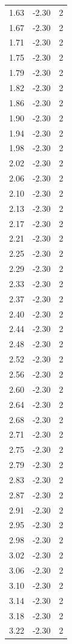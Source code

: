 \begin{longtable}{lrr}
  1.63 & -2.30 & 2 \\
  1.67 & -2.30 & 2 \\
  1.71 & -2.30 & 2 \\
  1.75 & -2.30 & 2 \\
  1.79 & -2.30 & 2 \\
  1.82 & -2.30 & 2 \\
  1.86 & -2.30 & 2 \\
  1.90 & -2.30 & 2 \\
  1.94 & -2.30 & 2 \\
  1.98 & -2.30 & 2 \\
  2.02 & -2.30 & 2 \\
  2.06 & -2.30 & 2 \\
  2.10 & -2.30 & 2 \\
  2.13 & -2.30 & 2 \\
  2.17 & -2.30 & 2 \\
  2.21 & -2.30 & 2 \\
  2.25 & -2.30 & 2 \\
  2.29 & -2.30 & 2 \\
  2.33 & -2.30 & 2 \\
  2.37 & -2.30 & 2 \\
  2.40 & -2.30 & 2 \\
  2.44 & -2.30 & 2 \\
  2.48 & -2.30 & 2 \\
  2.52 & -2.30 & 2 \\
  2.56 & -2.30 & 2 \\
  2.60 & -2.30 & 2 \\
  2.64 & -2.30 & 2 \\
  2.68 & -2.30 & 2 \\
  2.71 & -2.30 & 2 \\
  2.75 & -2.30 & 2 \\
  2.79 & -2.30 & 2 \\
  2.83 & -2.30 & 2 \\
  2.87 & -2.30 & 2 \\
  2.91 & -2.30 & 2 \\
  2.95 & -2.30 & 2 \\
  2.98 & -2.30 & 2 \\
  3.02 & -2.30 & 2 \\
  3.06 & -2.30 & 2 \\
  3.10 & -2.30 & 2 \\
  3.14 & -2.30 & 2 \\
  3.18 & -2.30 & 2 \\
  3.22 & -2.30 & 2 \\

\end{longtable}
